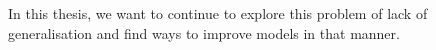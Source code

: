 In this thesis, we want to continue to explore this problem of lack of generalisation and find ways to improve models in that manner.




















































































































